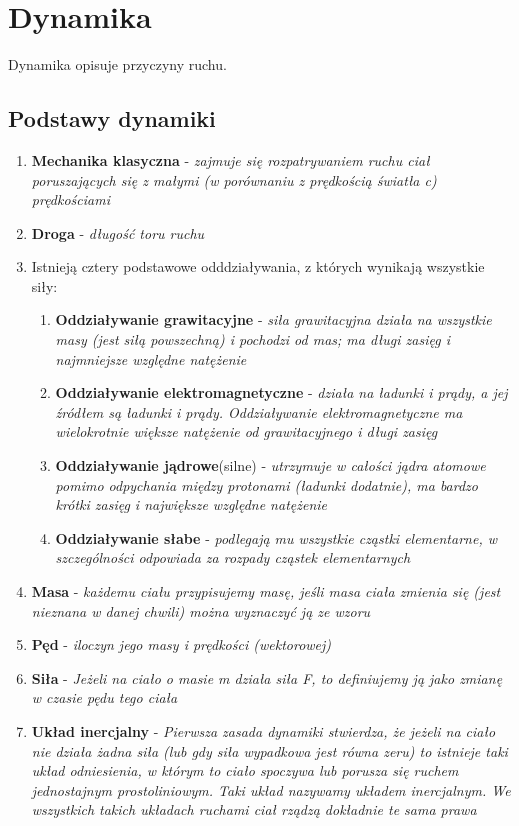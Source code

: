 \documentclass[12pt,twoside,a4paper]{book}
\begin{document}
\chapter{Dynamika}
Dynamika opisuje przyczyny ruchu.
\section{Podstawy dynamiki}
\begin{enumerate}[label=(\alph*)]
\item\textbf{Mechanika klasyczna} - \textit{zajmuje się rozpatrywaniem ruchu ciał poruszających się z małymi (w porównaniu z prędkością światła c) prędkościami}
\item\textbf{Droga} - \textit{długość toru ruchu}

\item Istnieją cztery podstawowe odddziaływania, z których wynikają wszystkie siły:
\begin{enumerate}[label=(\Roman*)]
\item\textbf{Oddziaływanie grawitacyjne} - \textit{siła grawitacyjna działa na wszystkie masy (jest siłą powszechną) i pochodzi od mas; ma długi zasięg i najmniejsze względne natężenie}
\item\textbf{Oddziaływanie elektromagnetyczne} - \textit{działa na ładunki i prądy, a jej źródłem są ładunki i prądy. Oddziaływanie elektromagnetyczne ma wielokrotnie większe natężenie od grawitacyjnego i długi zasięg}
\item\textbf{Oddziaływanie jądrowe}(silne) - \textit{utrzymuje w całości jądra atomowe pomimo
odpychania między protonami (ładunki dodatnie), ma bardzo krótki zasięg i największe
względne natężenie}
\item\textbf{Oddziaływanie słabe} - \textit{podlegają mu wszystkie cząstki elementarne,
w szczególności odpowiada za rozpady cząstek elementarnych}
\end{enumerate}
\item\textbf{Masa} - \textit{każdemu ciału przypisujemy masę, jeśli masa ciała zmienia się (jest nieznana w danej chwili) można wyznaczyć ją ze wzoru}
\item\textbf{Pęd} - \textit{iloczyn jego masy i prędkości (wektorowej)}
\item\textbf{Siła} - \textit{Jeżeli na ciało o masie m działa siła F, to definiujemy ją jako zmianę w czasie pędu tego ciała}
\item\textbf{Układ inercjalny} - \textit{Pierwsza zasada dynamiki stwierdza, że jeżeli na ciało nie działa żadna siła (lub gdy siła wypadkowa jest równa zeru) to istnieje taki układ odniesienia, w którym to ciało spoczywa lub porusza się ruchem jednostajnym prostoliniowym. Taki układ nazywamy układem inercjalnym. We wszystkich takich układach ruchami ciał rządzą dokładnie te sama prawa}

\end{enumerate}
\end{document}
